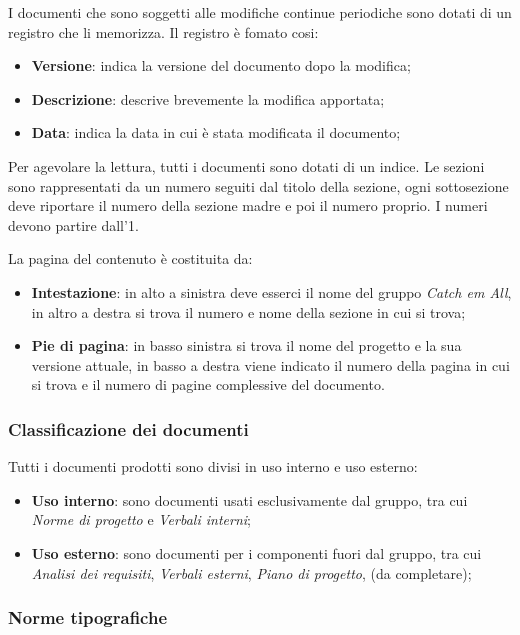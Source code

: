 I documenti che sono soggetti alle modifiche continue periodiche sono dotati di un registro che li memorizza. Il registro è fomato cosi:
\begin{itemize}
    \item \textbf{Versione}: indica la versione del documento dopo la modifica;
    \item \textbf{Descrizione}: descrive brevemente la modifica apportata;
    \item \textbf{Data}: indica la data in cui è stata modificata il documento;
\end{itemize}

Per agevolare la lettura, tutti i documenti sono dotati di un indice. Le sezioni sono rappresentati da un numero seguiti dal titolo della sezione, ogni sottosezione deve riportare il numero della sezione madre e poi il numero proprio. I numeri devono partire dall'1.

La pagina del contenuto è costituita da:
\begin{itemize}
    \item \textbf{Intestazione}: in alto a sinistra deve esserci il nome del gruppo \textit{Catch em All}, in altro a destra si trova il numero e nome della sezione in cui si trova;
    \item \textbf{Pie di pagina}: in basso sinistra si trova il nome del progetto e la sua versione attuale, in basso a destra viene indicato il numero della pagina in cui si trova e il numero di pagine complessive del documento.
\end{itemize}

\subsubsection{Classificazione dei documenti}
Tutti i documenti prodotti sono divisi in uso interno e uso esterno:
\begin{itemize}
    \item \textbf{Uso interno}: sono documenti usati esclusivamente dal gruppo, tra cui \textit{Norme di progetto} e \textit{Verbali interni};
    \item \textbf{Uso esterno}: sono documenti per i componenti fuori dal gruppo, tra cui \textit{Analisi dei requisiti}, \textit{Verbali esterni}, \textit{Piano di progetto}, (da completare);
\end{itemize}

\subsubsection{Norme tipografiche}

